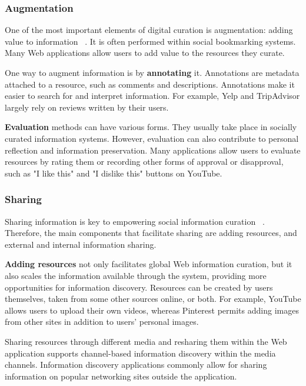 {{{\subsubsection{Augmentation}
One of the most important elements of digital curation is augmentation: adding value to information ~\cite{beagrie2008digital,whittaker2011personal}. It is often performed within social bookmarking systems. Many Web applications allow users to add value to the resources they curate. 

One way to augment information is by \textbf{annotating} it. Annotations are metadata attached to a resource, such as comments and descriptions. Annotations make it easier to search for and interpret information. For example, Yelp and TripAdvisor largely rely on reviews written by their users. 

\textbf{Evaluation} methods can have various forms. They usually take place in socially curated information systems. However, evaluation can also contribute to personal reflection and information preservation. Many applications allow users to evaluate resources by rating them or recording other forms of approval or disapproval, such as "I like this" and "I dislike this" buttons on YouTube.
} %

{\subsubsection{Sharing}
Sharing information is key to empowering social information curation ~\cite{beagrie2008digital}. Therefore, the main components that facilitate sharing are adding resources, and external and internal information sharing.

\textbf{Adding resources} not only facilitates global Web information curation, but it also scales the information available through the system, providing more opportunities for information discovery. Resources can be created by users themselves, taken from some other sources online, or both. For example, YouTube allows users to upload their own videos, whereas Pinterest permits adding images from other sites in addition to users' personal images. 

Sharing resources through different media and resharing them within the Web application supports channel-based information discovery within the media channels. Information discovery applications commonly allow for sharing information on popular networking sites outside the application.
} %

}}
